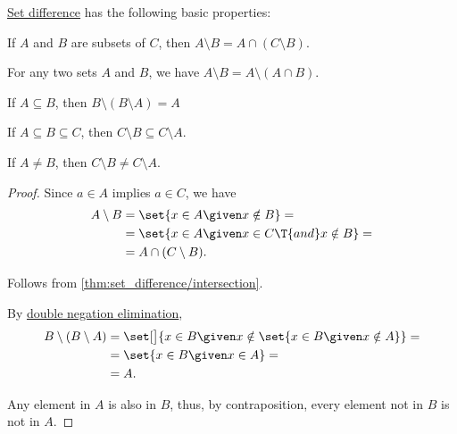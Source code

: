 \begin{proposition}\label{thm:set_difference}
  \hyperref[def:basic_set_operations/difference]{Set difference} has the following basic properties:
  \begin{thmenum}
     If \( A \) and \( B \) are subsets of \( C \), then \( A \setminus B = A \cap (C \setminus B) \).

     For any two sets \( A \) and \( B \), we have \( A \setminus B = A \setminus (A \cap B) \).

     If \( A \subseteq B \), then \( B \setminus (B \setminus A) = A \)

     If \( A \subseteq B \subseteq C \), then \( C \setminus B \subseteq C \setminus A \).

    If \( A \neq B \), then \( C \setminus B \neq C \setminus A \).
  \end{thmenum}
\end{proposition}
\begin{proof}
   Since \( a \in A \) implies \( a \in C \), we have
  \begin{align*}
    A \setminus B
    &=
    \set{ x \in A \given x \notin B }
    = \\ &=
    \set{ x \in A \given x \in C \T{and} x \notin B }
    = \\ &=
    A \cap (C \setminus B).
  \end{align*}

   Follows from \cref{thm:set_difference/intersection}.

   By \hyperref[thm:propositional_semantic_dne]{double negation elimination},
  \begin{align*}
    B \setminus (B \setminus A)
    &=
    \set[\big]{ x \in B \given x \notin \set{ x \in B \given x \notin A } }
    = \\ &=
    \set{ x \in B \given x \in A }
    = \\ &=
    A.
  \end{align*}

   Any element in \( A \) is also in \( B \), thus, by contraposition, every element not in \( B \) is not in \( A \).
\end{proof}

